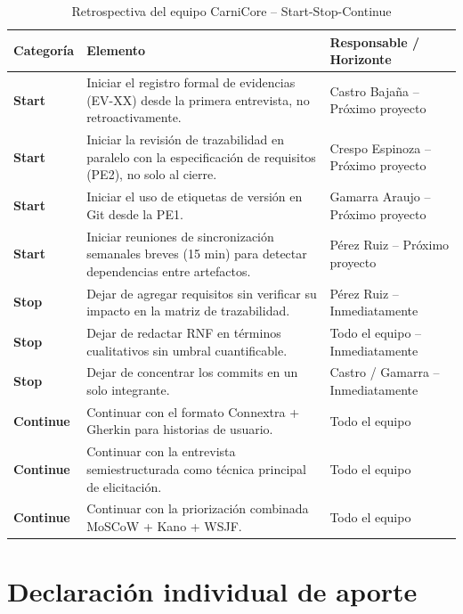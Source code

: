 \documentclass[11pt,a4paper]{article}
\begin{document}
\begin{longtable}{|p{2cm}|p{6cm}|p{5cm}|}
\caption{Retrospectiva del equipo CarniCore -- Start-Stop-Continue}\\
\hline
\textbf{Categoría} & \textbf{Elemento} & \textbf{Responsable / Horizonte} \\
\hline
\textbf{Start} & Iniciar el registro formal de evidencias (EV-XX) desde la primera entrevista, no retroactivamente. & Castro Bajaña -- Próximo proyecto \\
\hline
\textbf{Start} & Iniciar la revisión de trazabilidad en paralelo con la especificación de requisitos (PE2), no solo al cierre. & Crespo Espinoza -- Próximo proyecto \\
\hline
\textbf{Start} & Iniciar el uso de etiquetas de versión en Git desde la PE1. & Gamarra Araujo -- Próximo proyecto \\
\hline
\textbf{Start} & Iniciar reuniones de sincronización semanales breves (15 min) para detectar dependencias entre artefactos. & Pérez Ruiz -- Próximo proyecto \\
\hline
\textbf{Stop} & Dejar de agregar requisitos sin verificar su impacto en la matriz de trazabilidad. & Pérez Ruiz -- Inmediatamente \\
\hline
\textbf{Stop} & Dejar de redactar RNF en términos cualitativos sin umbral cuantificable. & Todo el equipo -- Inmediatamente \\
\hline
\textbf{Stop} & Dejar de concentrar los commits en un solo integrante. & Castro / Gamarra -- Inmediatamente \\
\hline
\textbf{Continue} & Continuar con el formato Connextra + Gherkin para historias de usuario. & Todo el equipo \\
\hline
\textbf{Continue} & Continuar con la entrevista semiestructurada como técnica principal de elicitación. & Todo el equipo \\
\hline
\textbf{Continue} & Continuar con la priorización combinada MoSCoW + Kano + WSJF. & Todo el equipo \\
\hline
\end{longtable}

\section{Declaración individual de aporte}
\end{document}
